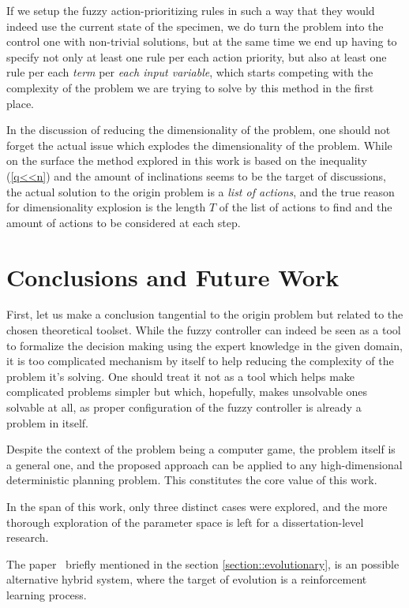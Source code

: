 \documentclass[11pt, a4paper]{article}
\begin{document}
	If we setup the fuzzy action-prioritizing rules in such a way that they would indeed use the current state of the specimen, we do turn the problem into the control one with non-trivial solutions, but at the same time we end up having to specify not only at least one rule per each action priority, but also at least one rule per each \textit{term} per \textit{each input variable}, which starts competing with the complexity of the problem we are trying to solve by this method in the first place.
	
	In the discussion of reducing the dimensionality of the problem, one should not forget the actual issue which explodes the dimensionality of the problem.
	While on the surface the method explored in this work is based on the inequality (\ref{q<<n}) and the amount of inclinations seems to be the target of discussions, the actual solution to the origin problem is a \textit{list of actions}, and the true reason for dimensionality explosion is the length $T$ of the list of actions to find and the amount of actions to be considered at each step.
	
	\section{Conclusions and Future Work}

	First, let us make a conclusion tangential to the origin problem but related to the chosen theoretical toolset.
	While the fuzzy controller can indeed be seen as a tool to formalize the decision making using the expert knowledge in the given domain, it is too complicated mechanism by itself to help reducing the complexity of the problem it's solving.
	One should treat it not as a tool which helps make complicated problems simpler but which, hopefully, makes unsolvable ones solvable at all, as proper configuration of the fuzzy controller is already a problem in itself.

	Despite the context of the problem being a computer game, the problem itself is a general one, and the proposed approach can be applied to any high-dimensional deterministic planning problem.
	This constitutes the core value of this work.

	In the span of this work, only three distinct cases were explored, and the more thorough exploration of the parameter space is left for a dissertation-level research.

	The paper~\cite{song2023rl_ea} briefly mentioned in the section \ref{section::evolutionary}, is an possible alternative hybrid system, where the target of evolution is a reinforcement learning process.

	\printbibliography
\end{document}
